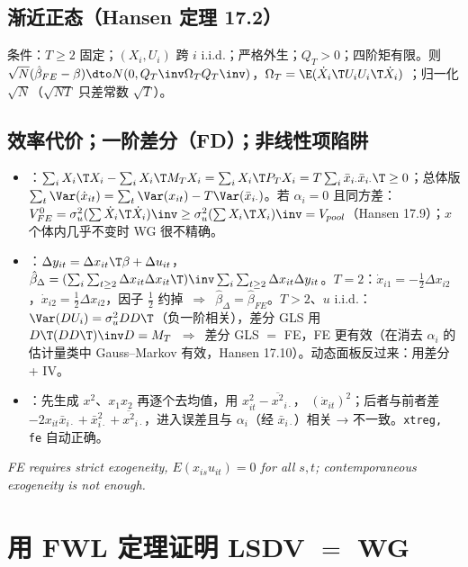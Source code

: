 \subsection{渐近正态（Hansen 定理 17.2）}
条件：$T\ge2$ 固定；$(X_i,U_i)$ 跨 $i$ i.i.d.；严格外生；$Q_T>0$；四阶矩有限。则 $\sqrt N(\hat\beta_{FE}-\beta)\dto N(0,Q_T\inv\Omega_TQ_T\inv)$，$\Omega_T=\E(\dot X_i\T U_iU_i\T\dot X_i)$ ；归一化 $\sqrt N$（$\sqrt{NT}$ 只差常数 $\sqrt T$）。

\subsection{效率代价；一阶差分（FD）；非线性项陷阱}
\begin{itemize}
\item {}：$\sum_iX_i\T X_i-\sum_iX_i\T M_TX_i=\sum_iX_i\T P_TX_i=T\sum_i\bar x_{i\cdot}\bar x_{i\cdot}\T\ge0$；总体版 $\sum_t\Var(\dot x_{it})=\sum_t\Var(x_{it})-T\Var(\bar x_{i\cdot})$。若 $\alpha_i=0$ 且同方差：$V^0_{FE}=\sigma_u^2(\sum\dot X_i\T\dot X_i)\inv\ge\sigma_u^2(\sum X_i\T X_i)\inv=V_{pool}$（Hansen 17.9）；$x$ 个体内几乎不变时 WG 很不精确。
\item {}：$\Delta y_{it}=\Delta x_{it}\T\beta+\Delta u_{it}$，$\hat\beta_\Delta=(\sum_i\sum_{t\ge2}\Delta x_{it}\Delta x_{it}\T)\inv\sum_i\sum_{t\ge2}\Delta x_{it}\Delta y_{it}$。$T=2$：$\dot x_{i1}=-\frac12\Delta x_{i2}$，$\dot x_{i2}=\frac12\Delta x_{i2}$，因子 $\frac12$ 约掉\ $\Rightarrow$\ $\hat\beta_\Delta=\hat\beta_{FE}$。$T>2$、$u$ i.i.d.：$\Var(DU_i)=\sigma_u^2DD\T$（负一阶相关），差分 GLS 用 $D\T(DD\T)\inv D=M_T$\ $\Rightarrow$\ 差分 GLS $=$ FE，FE 更有效（在消去 $\alpha_i$ 的估计量类中 Gauss–Markov 有效，Hansen 17.10）。动态面板反过来：用差分 + IV。
\item {}：先生成 $x^2$、$x_1x_2$ 再逐个去均值，用 $x_{it}^2-\overline{x^2}_{i\cdot}$， $(\dot x_{it})^2$；后者与前者差 $-2x_{it}\bar x_{i\cdot}+\bar x_{i\cdot}^2+\overline{x^2}_{i\cdot}$，进入误差且与 $\alpha_i$（经 $\bar x_{i\cdot}$）相关 → 不一致。\texttt{xtreg, fe} 自动正确。
\end{itemize}
\textit{FE requires strict exogeneity, $E(x_{is}u_{it})=0$ for all $s,t$; contemporaneous exogeneity is not enough.}

\section{用 FWL 定理证明 LSDV \texorpdfstring{$=$}{=} WG}\label{sec:QU10a-fwl}

